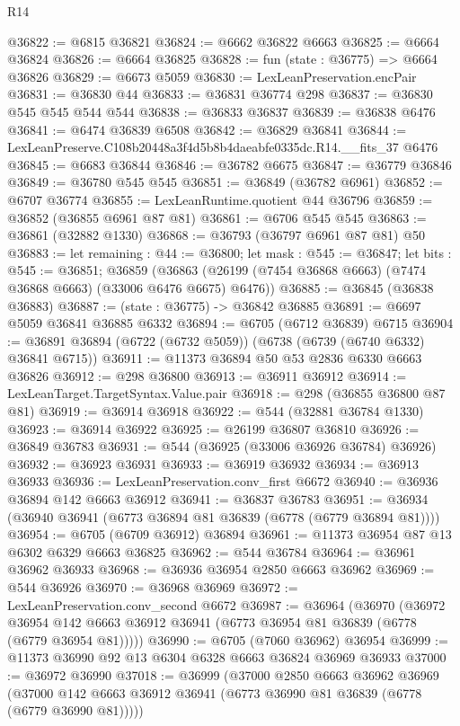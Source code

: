 \begin{lexlean}{R14}
\begin{coremodule}
@36822 := @6815 @36821
@36824 := @6662 @36822 @6663
@36825 := @6664 @36824
@36826 := @6664 @36825
@36828 := fun (state : @36775) => @6664 @36826
@36829 := @6673 @5059
@36830 := LexLeanPreservation.encPair
@36831 := @36830 @44
@36833 := @36831 @36774 @298
@36837 := @36830 @545 @545 @544 @544
@36838 := @36833 @36837
@36839 := @36838 @6476
@36841 := @6474 @36839 @6508
@36842 := @36829 @36841
@36844 := LexLeanPreserve.C108b20448a3f4d5b8b4daeabfe0335dc.R14.__fits_37 @6476
@36845 := @6683 @36844
@36846 := @36782 @6675
@36847 := @36779 @36846
@36849 := @36780 @545 @545
@36851 := @36849 (@36782 @6961)
@36852 := @6707 @36774
@36855 := LexLeanRuntime.quotient @44 @36796
@36859 := @36852 (@36855 @6961 @87 @81)
@36861 := @6706 @545 @545
@36863 := @36861 (@32882 @1330)
@36868 := @36793 (@36797 @6961 @87 @81) @50
@36883 := let remaining : @44 := @36800;
  let mask : @545 := @36847;
  let bits : @545 := @36851;
  @36859 (@36863 (@26199 (@7454 @36868 @6663) (@7474 @36868 @6663) (@33006 @6476 @6675) @6476))
@36885 := @36845 (@36838 @36883)
@36887 := (state : @36775) -> @36842 @36885
@36891 := @6697 @5059 @36841 @36885 @6332
@36894 := @6705 (@6712 @36839) @6715
@36904 := @36891 @36894 (@6722 (@6732 @5059)) (@6738 (@6739 (@6740 @6332) @36841 @6715))
@36911 := @11373 @36894 @50 @53 @2836 @6330 @6663 @36826
@36912 := @298 @36800
@36913 := @36911 @36912
@36914 := LexLeanTarget.TargetSyntax.Value.pair
@36918 := @298 (@36855 @36800 @87 @81)
@36919 := @36914 @36918
@36922 := @544 (@32881 @36784 @1330)
@36923 := @36914 @36922
@36925 := @26199 @36807 @36810
@36926 := @36849 @36783
@36931 := @544 (@36925 (@33006 @36926 @36784) @36926)
@36932 := @36923 @36931
@36933 := @36919 @36932
@36934 := @36913 @36933
@36936 := LexLeanPreservation.conv_first @6672
@36940 := @36936 @36894 @142 @6663 @36912
@36941 := @36837 @36783
@36951 := @36934 (@36940 @36941 (@6773 @36894 @81 @36839 (@6778 (@6779 @36894 @81))))
@36954 := @6705 (@6709 @36912) @36894
@36961 := @11373 @36954 @87 @13 @6302 @6329 @6663 @36825
@36962 := @544 @36784
@36964 := @36961 @36962 @36933
@36968 := @36936 @36954 @2850 @6663 @36962
@36969 := @544 @36926
@36970 := @36968 @36969
@36972 := LexLeanPreservation.conv_second @6672
@36987 := @36964
    (@36970
      (@36972 @36954 @142 @6663 @36912 @36941 (@6773 @36954 @81 @36839 (@6778 (@6779 @36954 @81)))))
@36990 := @6705 (@7060 @36962) @36954
@36999 := @11373 @36990 @92 @13 @6304 @6328 @6663 @36824 @36969 @36933
@37000 := @36972 @36990
@37018 := @36999
    (@37000
      @2850
      @6663
      @36962
      @36969
      (@37000 @142 @6663 @36912 @36941 (@6773 @36990 @81 @36839 (@6778 (@6779 @36990 @81)))))

\end{coremodule}
\end{lexlean}
